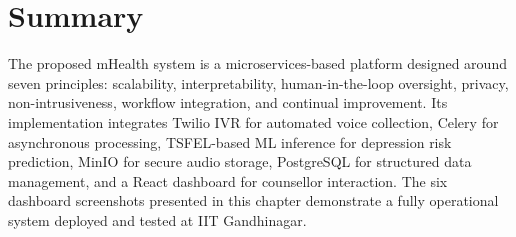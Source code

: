 \section{Summary}

The proposed mHealth system is a microservices-based platform designed around seven principles: scalability, interpretability, human-in-the-loop oversight, privacy, non-intrusiveness, workflow integration, and continual improvement. Its implementation integrates Twilio IVR for automated voice collection, Celery for asynchronous processing, TSFEL-based ML inference for depression risk prediction, MinIO for secure audio storage, PostgreSQL for structured data management, and a React dashboard for counsellor interaction. The six dashboard screenshots presented in this chapter demonstrate a fully operational system deployed and tested at IIT Gandhinagar.
